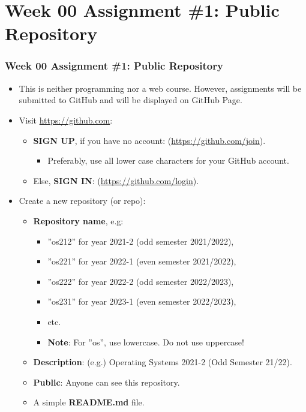 \documentclass[xcolor=table, notheorems, hyperref={pdfpagelabels=false}]{beamer}
\begin{document}

\section{Week 00 Assignment \#1: Public Repository}
\begin{frame}[fragile]
\frametitle{Week 00 Assignment \#1: Public Repository}
\begin{itemize}
\item This is neither programming nor a web course. However,
      assignments will be submitted to GitHub and will be displayed on GitHub Page. 
\item Visit \url{https://github.com}:
\begin{itemize}
\item \textbf{SIGN UP}, if you have no account: (\url{https://github.com/join}).
\begin{itemize}
\item Preferably, use all lower case characters for your GitHub account.
\end{itemize}
\item Else, \textbf{SIGN IN}: (\url{https://github.com/login}).
\end{itemize}
\item Create a new repository (or repo):
\begin{itemize}
\item \textbf{Repository name}, e.g:
\begin{itemize}
\item ''os212'' for year 2021-2 (odd  semester 2021/2022),
\item ''os221'' for year 2022-1 (even semester 2021/2022),
\item ''os222'' for year 2022-2 (odd  semester 2022/2023),
\item ''os231'' for year 2023-1 (even semester 2022/2023),
\item etc.
\item \textbf{Note}: For ''os'', use lowercase. Do not use uppercase!
\end{itemize}
\item \textbf{Description}: (e.g.) Operating Systems 2021-2 (Odd Semester 21/22).
\item \textbf{Public}: Anyone can see this repository.
\item A simple \textbf{README.md} file.
\end{itemize}
\end{itemize}

\end{frame}
\end{document}
